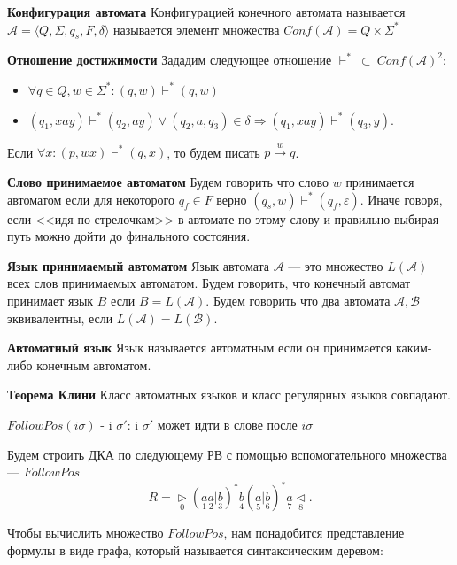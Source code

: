 \begin{multicols}{2}
\textbf{Конфигурация автомата}
Конфигурацией конечного автомата называется $\mathcal{A} = \langle Q, \Sigma, q_s, F, \delta\rangle$ называется элемент множества $Conf(\mathcal{A}) = Q\times \Sigma^*$

\textbf{Отношение достижимости}
Зададим следующее отношение $\vdash^* \ \subset \ Conf(\mathcal{A})^2$:
\begin{itemize}
    \item $\forall q \in Q, w \in \Sigma^*: (q, w) \vdash^* (q, w)$
    \item $(q_1, xay) \vdash^* (q_2, ay) \vee (q_2, a, q_3) \in \delta \Rightarrow (q_1, xay) \vdash^* (q_3, y).$
\end{itemize}
Если $\forall x: (p, wx) \vdash^* (q, x)$, то будем писать $p \xrightarrow{w} q$.


\textbf{Слово принимаемое автоматом}
Будем говорить что слово $w$ принимается автоматом если для некоторого $q_f \in F$ верно $(q_s, w) \vdash^* (q_f, \varepsilon)$. Иначе говоря, если <<идя по стрелочкам>> в автомате по этому слову и правильно выбирая путь можно дойти до финального состояния.

\textbf{Язык принимаемый автоматом}
Язык автомата $\mathcal{A}$ --- это множество $L(\mathcal{A})$ всех слов принимаемых автоматом. Будем говорить, что конечный автомат принимает язык $B$ если $B = L(\mathcal{
        A})$. Будем говорить что два автомата $\mathcal{A}, \mathcal{B}$ эквивалентны, если $L(\mathcal{A})=L(\mathcal{B})$.

\textbf{Автоматный язык}
Язык называется автоматным если он принимается каким-либо конечным автоматом.

\textbf{Теорема Клини}
Класс автоматных языков и класс регулярных языков совпадают.

\begin{definition}{}{}
    $FollowPos(i \sigma)$ - {i $\sigma'$: i $\sigma'$ может идти в слове после $i\sigma$}
\end{definition}


Будем строить ДКА по следующему РВ с помощью вспомогательного множества --- $FollowPos$
\[
    R = \underset{0}{\rhd}(\underset{1}{a}\underset{2}{a}|\underset{3}{b})^{*}\underset{4}{b}(\underset{5}{a}|\underset{6}{b})^{*}\underset{7}{a}\underset{8}{\lhd}.
\]

Чтобы вычислить множество $FollowPos$, нам понадобится представление формулы в виде графа, который называется синтаксическим деревом:



\end{multicols}
